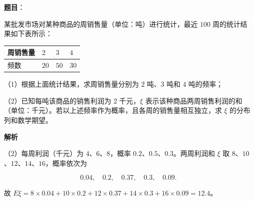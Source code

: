 \begin{answer}

\textbf{题目}：

某批发市场对某种商品的周销售量（单位：吨）进行统计，最近 $100$ 周的统计结果如下表所示：

\begin{center}
\begin{tabular}{llll}
\toprule
周销售量 & $2$ & $3$ & $4$ \\
\midrule
频数 & $20$ & $50$ & $30$ \\
\bottomrule
\end{tabular}
\end{center}

（1）根据上面统计结果，求周销售量分别为 $2$ 吨、$3$ 吨和 $4$ 吨的频率；

（2）已知每吨该商品的销售利润为 $2$ 千元，$\xi$ 表示该种商品两周销售利润的和（单位：千元）。若以上述频率作为概率，且各周的销售量相互独立，求 $\xi$ 的分布列和数学期望。

\textbf{解析}

（2）每周利润（千元）为 $4$、$6$、$8$，概率 $0.2$、$0.5$、$0.3$。两周利润和 $\xi$ 取 $8$、$10$、$12$、$14$、$16$，概率依次为

\nopagebreak[4]
\[0.04,\quad0.2,\quad0.37,\quad0.3,\quad0.09.\]

故 $E\xi=8\times0.04+10\times0.2+12\times0.37+14\times0.3+16\times0.09=12.4$。


\end{answer}
